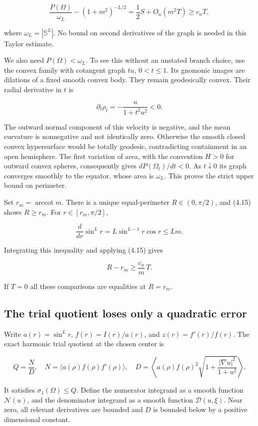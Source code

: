 \documentclass[11pt]{article}
\begin{document}
\[
\frac{P(\Omega)}{\omega_L}-(1+m^2)^{-L/2}
=\frac12S+O_n(m^2T)\geq c_nT,
\tag{4.15}
\]

where \(\omega_L=|\mathbb S^L|\). No bound on second derivatives of the
graph is needed in this Taylor estimate.

We also need \(P(\Omega)<\omega_L\). To see this without an unstated
branch choice, use the convex family with cotangent graph \(tu\),
\(0<t\leq1\). Its gnomonic images are dilations of a fixed smooth convex
body. They remain geodesically convex. Their radial derivative in \(t\)
is

\[
\partial_t\rho_t=-\frac{u}{1+t^2u^2}<0.
\tag{4.16}
\]

The outward normal component of this velocity is negative, and the mean
curvature is nonnegative and not identically zero. Otherwise the smooth
closed convex hypersurface would be totally geodesic, contradicting
containment in an open hemisphere. The first variation of area, with the
convention \(H>0\) for outward convex spheres, consequently gives
\(dP(\Omega_t)/dt<0\). As \(t\downarrow0\) its graph converges smoothly
to the equator, whose area is \(\omega_L\). This proves the strict upper
bound on perimeter.

Set \(r_m=\operatorname{arccot}m\). There is a unique equal-perimeter
\(R\in(0,\pi/2)\), and (4.15) shows \(R\geq r_m\). For
\(r\in[r_m,\pi/2]\),

\[
\frac{d}{dr}\sin^Lr=L\sin^{L-1}r\cos r\leq Lm.
\tag{4.17}
\]

Integrating this inequality and applying (4.15) gives

\[
R-r_m\geq \frac{c_n}{m}\,T.
\tag{4.18}
\]

If \(T=0\) all these comparisons are equalities at \(R=r_m\).

\subsection{The trial quotient loses only a quadratic
error}\label{the-trial-quotient-loses-only-a-quadratic-error}

Write \(a(r)=\sin^Lr\), \(f(r)=I(r)/a(r)\), and \(z(r)=f'(r)/f(r)\). The
exact harmonic trial quotient at the chosen center is

\[
Q=\frac{N}{D},\quad
N=\langle a(\rho)f(\rho)f'(\rho)\rangle,\quad
D=\left\langle a(\rho)f(\rho)^2
\sqrt{1+\frac{|\nabla u|^2}{1+u^2}}\right\rangle.
\tag{4.19}
\]

It satisfies \(\sigma_1(\Omega)\leq Q\). Define the numerator integrand
as a smooth function \(\mathcal N(u)\), and the denominator integrand as
a smooth function \(\mathcal D(u,\xi)\). Near zero, all relevant
derivatives are bounded and \(D\) is bounded below by a positive
dimensional constant.
\end{document}
